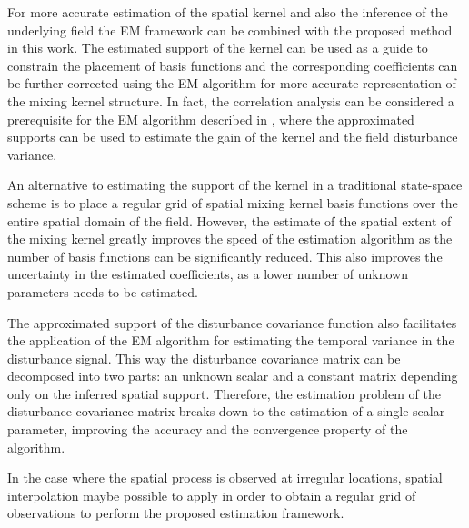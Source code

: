 \documentclass[10pt,twocolumn,twoside]{IEEEtran}
\begin{document}
For more accurate estimation of the spatial kernel and also the inference of the underlying field the EM framework can be combined with the proposed method in this work. The estimated support of the kernel can be  used as a guide to constrain the placement of basis functions and the corresponding coefficients can be further corrected using the EM algorithm for more accurate representation of the mixing kernel structure. In fact, the correlation analysis can be considered a prerequisite for the EM algorithm described in \cite{Dewar2009}, where the approximated supports can be used to estimate the gain of the kernel and the field disturbance variance.                                             
                                                                                                                                                                              

An alternative to estimating the support of the kernel in a traditional state-space scheme is to place a regular grid of spatial mixing kernel basis functions over the entire spatial domain of the field. However, the estimate of the spatial extent of the mixing kernel greatly improves the speed of the estimation algorithm as the number of basis functions can be significantly reduced. This also improves the uncertainty in the estimated coefficients, as a lower number of unknown parameters needs to be estimated. 

The approximated support of the disturbance covariance function also facilitates the application of the EM algorithm for estimating the temporal variance in the disturbance signal. This way the disturbance covariance matrix can be decomposed into two parts: an unknown scalar and a constant matrix depending only on the inferred spatial support. Therefore, the estimation problem of the disturbance covariance matrix breaks down to the estimation of a single scalar parameter, improving the accuracy and the convergence property of the algorithm.

In the case where the spatial process is observed at irregular locations, spatial interpolation maybe possible to apply in order to obtain a regular grid of observations to perform the proposed estimation framework.
\end{document}
